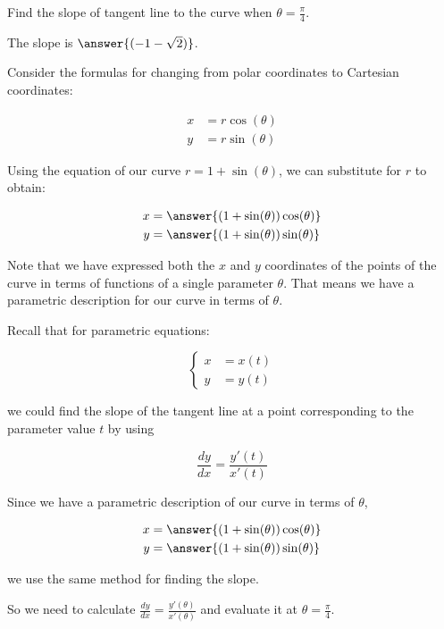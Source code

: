 \documentclass{ximera}
\begin{document}
\begin{exercise}
\begin{hint}
\end{hint}

\begin{exercise}

Find the slope of tangent line to the curve when $\theta=\frac{\pi}{4}$. 

The slope is $\answer{ ( -1-\sqrt{2} )  }$.

\begin{hint}

Consider the formulas for changing from polar coordinates to Cartesian coordinates:

\begin{align*}
x&=r\cos(\theta) \\
y&=r\sin(\theta)
\end{align*}

Using the equation of our curve $r=1+\sin(\theta)$, we can substitute for $r$ to obtain:

\begin{align*}
x&=\answer{(1+\sin(\theta))\cos(\theta)} \\
y&=\answer{(1+\sin(\theta))\sin(\theta) }
\end{align*}

Note that we have expressed both the $x$ and $y$ coordinates of the points of the curve in terms of functions of a single parameter $\theta$. That means we have a parametric description for our curve in terms of $\theta$. 

Recall that for parametric equations: 

\[ \begin{cases}
x&=x(t) \\
y&=y(t)
\end{cases} \]

we could find the slope of the tangent line at a point corresponding to the parameter value $t$ by using 

\[\frac{dy}{dx}=\frac{ y'(t)}{x'(t)}\]


Since we have a parametric description of our curve in terms of $\theta$, 

\begin{align*}
x&=\answer{(1+\sin(\theta))\cos(\theta)} \\
y&=\answer{(1+\sin(\theta))\sin(\theta) }
\end{align*}

we use the same method for finding the slope. 

So we need to calculate $\frac{dy}{dx}=\frac{ y'(\theta)}{x'(\theta)}$ and evaluate it at $\theta=\frac{\pi}{4}$. 


\end{hint}
\end{exercise}
\end{exercise}
\end{document}
